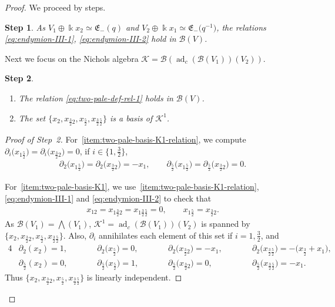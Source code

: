 \documentclass[10pt,a4paper]{amsart}
\numberwithin{equation}{section}
\newtheorem{stepiii}{Step}
\newcommand{\adc}{\operatorname{ad}_c}
\newcommand{\toba}{\mathscr B}
\newcommand{\K}{{\mathcal{K}}}
\newcommand{\eny}{\mathfrak{E}}
\newcommand{\tresdos}{\frac{3}{2}}
\newcommand{\cincodos}{\frac{5}{2}}
\begin{document}
\begin{proof} We proceed by steps.

\begin{stepiii}%
As $V_1 \oplus \Bbbk x_2 \simeq \eny_-(q)$ and $V_2 \oplus \Bbbk x_1 \simeq \eny_-\big(q^{-1}\big)$, the relations \eqref{eq:endymion-III-1}, \eqref{eq:endymion-III-2}
hold in $\toba(V)$.
\end{stepiii}

Next we focus on the Nichols algebra $\K = \toba\left(\adc(\toba(V_1))(V_2)\right)$.

\begin{stepiii}\quad%
\begin{enumerate}[label=$(\alph*)$]
\item\label{item:two-pale-basis-K1-relation}
The relation \eqref{eq:two-pale-def-rel-1} holds in $\toba(V)$.
\item\label{item:two-pale-basis-K1}
The set $\big\{x_{2}, x_{\tresdos2}, x_{\cincodos}, x_{\tresdos\cincodos} \big\}$ is a basis of $\K^1$.
\end{enumerate}
\end{stepiii}

\begin{proof}[Proof of Step~2]
For~\ref{item:two-pale-basis-K1-relation}, we compute $\partial_i\big(x_{1\cincodos}\big)= \partial_i\big(x_{\tresdos2}\big)=0$, if $i\in\big\{1,\tresdos\big\}$,
\begin{align*}
\partial_2\big(x_{1\cincodos}\big) = \partial_2\big(x_{\tresdos2}\big)=-x_1, \qquad
 \partial_{\cincodos}\big(x_{1\cincodos}\big) = \partial_{\cincodos}\big(x_{\tresdos2}\big)=0.
\end{align*}

For~\ref{item:two-pale-basis-K1}, we use~\ref{item:two-pale-basis-K1-relation}, \eqref{eq:endymion-III-1} and \eqref{eq:endymion-III-2} to check that
\begin{align*}
x_{12} = x_{1\tresdos2} = x_{1\tresdos\cincodos} = 0, \qquad x_{1\cincodos} = x_{\tresdos2}.
\end{align*}
As $\toba(V_1) = \bigwedge(V_1)$, $\K^1 = \adc(\toba(V_1))(V_2)$ is spanned by
$\big\{x_{2}, x_{\tresdos2}, x_{\cincodos}, x_{\tresdos\cincodos} \big\}$. Also, $\partial_i$ annihilates each element of this set if $i=1,\tresdos$, and
\begin{alignat*}{4}
&\partial_2(x_{2}) = 1,\qquad &&\partial_2\big(x_{\cincodos}\big) = 0, \qquad &&\partial_2\big(x_{\tresdos2}\big) = -x_1, \qquad &&\partial_2\big(x_{\tresdos\cincodos}\big) = -\big(x_\tresdos+x_1\big),
\\
&\partial_\cincodos(x_{2}) = 0, &&\partial_\cincodos\big(x_{\cincodos}\big) = 1, &&\partial_\cincodos\big(x_{\tresdos2}\big) = 0, &&\partial_\cincodos\big(x_{\tresdos\cincodos}\big) = -x_1.
\end{alignat*}
Thus $\big\{x_{2}, x_{\tresdos2}, x_{\cincodos}, x_{\tresdos\cincodos} \big\}$ is linearly independent.
\end{proof}


\end{proof}
\end{document}
